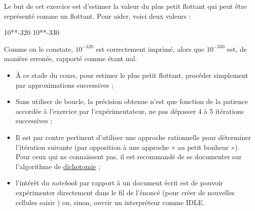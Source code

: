 \begin{exercise}[title=Plus petit flottant, level=basic]
Le but de cet exercice est d'estimer la valeur du plus petit flottant qui peut être représenté comme un flottant. Pour aider, voici deux valeurs :
\begin{idleconsole}
	\begin{pyconsole}
		10**-320
		10**-330
	\end{pyconsole}
\end{idleconsole}


Comme on le constate, $10^{−320}$ est correctement imprimé, alors que $10^{−330}$ est, de manière erronée, rapporté comme étant nul.

\noindent {}
\begin{itemize}\jazzitem
	\item À ce stade du cours, pour estimer le plus petit flottant, procéder simplement par approximations successives ;
	\item Sans utiliser de boucle, la précision obtenue n'est que fonction de la patience accordée à l'exercice par l'expérimentateur, ne pas dépasser 4 à 5 itérations successives ;
	\item Il est par contre pertinent d'utiliser une approche rationnelle pour déterminer l'itération suivante (par opposition à une approche « au petit bonheur »). Pour ceux qui ne connaissent pas, il est recommandé de se documenter sur l'algorithme de \href{https://fr.wikipedia.org/wiki/Recherche\_dichotomique}{dichotomie} ;
	\item l'intérêt du \textit{notebook} par rapport à un document écrit est de pouvoir expérimenter directement dans le fil de l'énoncé (pour créer de nouvelles cellules saisir ) ou, sinon, ouvrir un interpréteur comme IDLE.
\end{itemize}
\end{exercise}


